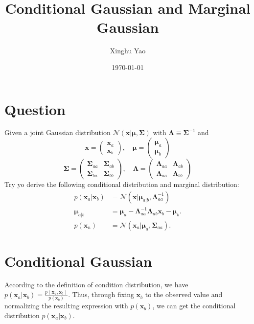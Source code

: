 \documentclass{article}
\title{Conditional Gaussian and Marginal Gaussian}
\author{Xinghu Yao}
\date{\today}
\begin{document}
	\maketitle
	\section{Question}
    Given a joint Gaussian distribution $\mathcal{N}\left(\mathbf{x}|\boldsymbol{\mu},\mathbf{\Sigma}\right)$ with $\mathbf{\Lambda} \equiv \mathbf{\Sigma}^{-1}$ and
    \begin{equation}
        \mathbf{x} =\left( {\begin{array}{c}
    \mathbf{x}_a\\
    \mathbf{x}_b
    \end{array}} \right),\quad
    \boldsymbol{\mu} =\left( {\begin{array}{c}
    \boldsymbol{\mu}_a\\
    \boldsymbol{\mu}_b
    \end{array}} \right)\label{eq:joint1}
   \end{equation}
   \begin{equation}
    \mathbf{\Sigma} = \left(\begin{array}{cc}
    \mathbf{\Sigma}_{aa} & \mathbf{\Sigma}_{ab}\\
    \mathbf{\Sigma}_{ba} & \mathbf{\Sigma}_{bb}
    \end{array}\right),\quad
    \mathbf{\Lambda} =\left(\begin{array}{cc}
    \mathbf{\Lambda}_{aa} & \mathbf{\Lambda}_{ab}\\
    \mathbf{\Lambda}_{aa} & \mathbf{\Lambda}_{bb}
    \end{array}\right)\label{eq:joint2}
   \end{equation}
   Try yo derive the following conditional distribution and marginal distribution:
   \begin{align}
   p\left(\mathbf{x}_a|\mathbf{x}_b\right) &=\mathcal{N}\left(\mathbf{x}|\boldsymbol{\mu}_{a|b},\mathbf{\Lambda}_{aa}^{-1}\right)\\
   \boldsymbol{\mu}_{a|b} &= \boldsymbol{\mu}_a - \mathbf{\Lambda}_{aa}^{-1}\mathbf{\Lambda}_{ab}\mathbf{x}_b - \boldsymbol{\mu}_b.\\
   p\left(\mathbf{x}_n\right) &= \mathcal{N}\left(\mathbf{x}_a|\boldsymbol{\mu}_a,\mathbf{\Sigma}_{aa}\right).
   \end{align}
   \section{Conditional Gaussian}
   \par According to the definition of condition distribution, we have $p\left(\mathbf{x}_a|\mathbf{x}_b\right) = \frac{p\left(\mathbf{x}_a,\mathbf{x}_b\right)}{p\left(\mathbf{x}_b\right)}$. Thus, through fixing $\mathbf{x}_b$ to the observed value and normalizing the resulting expression with $p\left(\mathbf{x}_b\right)$, we can get the conditional distribution $p\left(\mathbf{x}_a|\mathbf{x}_b\right)$.
	
\end{document}

